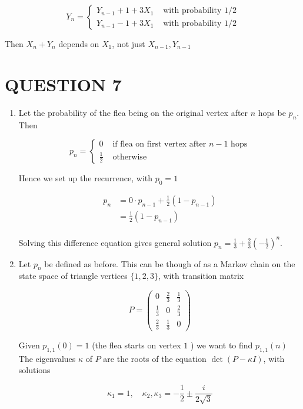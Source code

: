 \documentclass[a4paper]{article}
\begin{document}
\[ Y_{n} = \begin{cases} Y_{n-1} + 1 + 3 X_{1}   & \text{ with probability } 1/2 \\  Y_{n-1} - 1 + 3 X_{1} & \text{ with probability } 1/2 \end{cases} \]

Then $ X_{n} + Y_{n}  $ depends on $ X_{1} $, not just $ X_{n-1},Y_{n-1} $


\section{QUESTION 7}

\begin{enumerate}
	\item Let the probability of the flea being on the original vertex after $ n $ hops be $ p_{n} $. Then

\[ p_{n} = \begin{cases} 0  & \text{ if flea on first vertex after } n-1 \text{ hops}  \\ \frac{1}{2} & \text{ otherwise } \end{cases} \]

Hence we set up the recurrence, with $ p_{0} = 1 $

\begin{align*}
p_{n} & = 0 \cdot p_{n-1} + \frac{1}{2} (1 - p_{n-1})  \\
& = \frac{1}{2} (1 - p_{n-1}) \\
\end{align*}

Solving this difference equation gives general solution $ p_{n} = \frac{1}{3} + \frac{2}{3}\left( - \frac{1}{2} \right)^{n}   $.

\item Let $ p_{n} $ be defined as before. This can be though of as a Markov chain on the state space of triangle vertices $ \{1,2,3\} $, with transition matrix

\[ P = \begin{pmatrix}
0 & \frac{2}{3} & \frac{1}{3} \\
\frac{1}{3} & 0 & \frac{2}{3} \\
\frac{2}{3} & \frac{1}{3} & 0
\end{pmatrix} \]
	
Given $ p_{1,1}(0) = 1 $ (the flea starts on vertex $ 1 $ ) we want to find $ p_{1,1}(n) $ The eigenvalues $ \kappa $ of $ P $ are the roots of the equation $ \det(P - \kappa I) $, with solutions

\[ \kappa_{1} = 1, \quad \kappa_{2}, \kappa_{3} = - \frac{1}{2} \pm \frac{i}{2\sqrt{3}} \]	




\end{enumerate}
\end{document}

